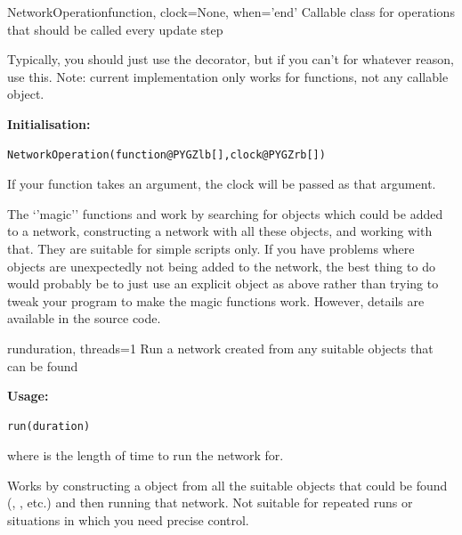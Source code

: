 \documentclass[letterpaper,10pt,english]{manual}
\begin{document}
\hypertarget{brian.NetworkOperation}{}\begin{classdesc}{NetworkOperation}{function, clock=None, when='end'}
Callable class for operations that should be called every update step

Typically, you should just use the \hyperlink{brian.network_operation}{} decorator, but if you
can't for whatever reason, use this. Note: current implementation only works for
functions, not any callable object.

\textbf{Initialisation:}

\begin{Verbatim}[commandchars=@\[\]]
NetworkOperation(function@PYGZlb[],clock@PYGZrb[])
\end{Verbatim}

If your function takes an argument, the clock will be passed
as that argument.
\end{classdesc}

The `'magic'' functions \hyperlink{brian.run}{} and \hyperlink{brian.reinit}{} work by searching for
objects which could be added to a network, constructing a network with all
these objects, and working with that. They are suitable for simple scripts
only. If you have problems where objects are unexpectedly not being added
to the network, the  best thing to do would probably be to just use an
explicit \hyperlink{brian.Network}{} object as above rather than trying to tweak your
program to make the magic functions work. However, details are available
in the  source code.

\hypertarget{brian.run}{}\begin{funcdesc}{run}{duration, threads=1}
Run a network created from any suitable objects that can be found

\textbf{Usage:}

\begin{Verbatim}[commandchars=@\[\]]
run(duration)
\end{Verbatim}

where  is the length of time to run the network for.

Works by constructing a \hyperlink{brian.MagicNetwork}{} object from all the suitable
objects that could be found (\hyperlink{brian.NeuronGroup}{}, \hyperlink{brian.Connection}{}, etc.) and
then running that network. Not suitable for repeated runs or situations
in which you need precise control.
\end{funcdesc}
\end{document}
